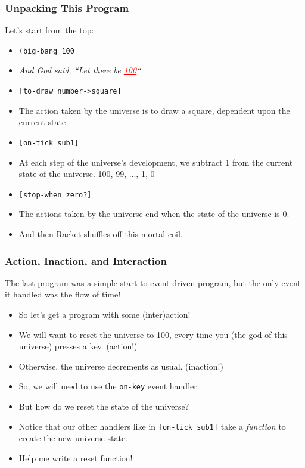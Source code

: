 \documentclass{beamer}
\begin{document}
\begin{frame}
  \frametitle{Unpacking This Program}
  Let's start from the top:
  \begin{itemize}
  \item<2-> \texttt{(big-bang 100}
  \item<3-> \emph{And God said, ``Let there be \textcolor{red}{\underline{100}}``}
  \item<4-> \texttt{[to-draw number->square]}
  \item<5-> The action taken by the universe is to draw a square, dependent upon
    the current state
  \item<6-> \texttt{[on-tick sub1]}
  \item<7-> At each step of the universe's development, we subtract 1 from
    the current state of the universe. 100, 99, ..., 1, 0
  \item<8-> \texttt{[stop-when zero?]}
  \item<9-> The actions taken by the universe end when the state of the universe
    is 0.
  \item<10-> And then Racket shuffles off this mortal coil.
  \end{itemize}
\end{frame}

\begin{frame}
  \frametitle{Action, Inaction, and Interaction}
  The last program was a simple start to event-driven program, but the only
  event it handled was the flow of time!
  \begin{itemize}
  \item<2-> So let's get a program with some (inter)action!
  \item<3-> We will want to reset the universe to 100, every time you (the god of this universe) presses a key. (action!)
  \item<4-> Otherwise, the universe decrements as usual. (inaction!)
  \item<5-> So, we will need to use the \texttt{on-key} event handler.
  \item<6-> But how do we reset the state of the universe?
  \item<7-> Notice that our other handlers like in \texttt{[on-tick sub1]} take a \emph{function} to create the new universe state.
  \item<8-> Help me write a reset function!
  \end{itemize}
\end{frame}
\end{document}
